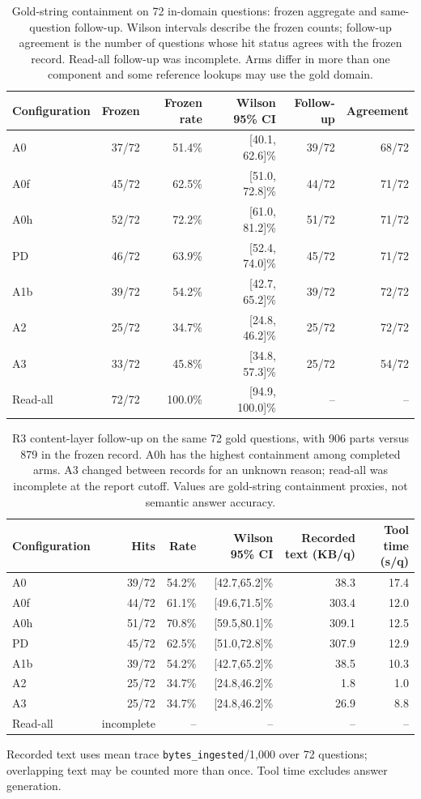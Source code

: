 \begin{table}[t]
\centering\small
\caption{Gold-string containment on 72 in-domain questions: frozen aggregate and same-question follow-up. Wilson intervals describe the frozen counts; follow-up agreement is the number of questions whose hit status agrees with the frozen record. Read-all follow-up was incomplete. Arms differ in more than one component and some reference lookups may use the gold domain.}
\label{tab:s-arm-data}
\begin{tabular}{lrrrrr}
\toprule
Configuration & Frozen & Frozen rate & Wilson 95\% CI & Follow-up & Agreement \\
\midrule
A0 & 37/72 & 51.4\% & [40.1, 62.6]\% & 39/72 & 68/72 \\
A0f & 45/72 & 62.5\% & [51.0, 72.8]\% & 44/72 & 71/72 \\
A0h & 52/72 & 72.2\% & [61.0, 81.2]\% & 51/72 & 71/72 \\
PD & 46/72 & 63.9\% & [52.4, 74.0]\% & 45/72 & 71/72 \\
A1b & 39/72 & 54.2\% & [42.7, 65.2]\% & 39/72 & 72/72 \\
A2 & 25/72 & 34.7\% & [24.8, 46.2]\% & 25/72 & 72/72 \\
A3 & 33/72 & 45.8\% & [34.8, 57.3]\% & 25/72 & 54/72 \\
Read-all & 72/72 & 100.0\% & [94.9, 100.0]\% & -- & -- \\
\bottomrule
\end{tabular}
\end{table}
\begin{table}[t]
\centering\small
\caption{R3 content-layer follow-up on the same 72 gold
questions, with 906 parts versus 879 in the frozen record. A0h has the highest containment among completed arms. A3 changed
between records for an unknown reason; read-all was incomplete at the report cutoff. Values are gold-string
containment proxies, not semantic answer accuracy.}
\label{tab:s-r3-content}
\begin{tabular}{lrrrrr}
\toprule
Configuration & Hits & Rate & Wilson 95\% CI & Recorded text (KB/q) & Tool time (s/q) \\
\midrule
A0 & 39/72 & 54.2\% & [42.7,65.2]\% & 38.3 & 17.4 \\
A0f & 44/72 & 61.1\% & [49.6,71.5]\% & 303.4 & 12.0 \\
A0h & 51/72 & 70.8\% & [59.5,80.1]\% & 309.1 & 12.5 \\
PD & 45/72 & 62.5\% & [51.0,72.8]\% & 307.9 & 12.9 \\
A1b & 39/72 & 54.2\% & [42.7,65.2]\% & 38.5 & 10.3 \\
A2 & 25/72 & 34.7\% & [24.8,46.2]\% & 1.8 & 1.0 \\
A3 & 25/72 & 34.7\% & [24.8,46.2]\% & 26.9 & 8.8 \\
Read-all & incomplete & -- & -- & -- & -- \\
\bottomrule
\end{tabular}
\par\vspace{5pt}
\parbox{0.97\textwidth}{\footnotesize Recorded text uses mean trace \texttt{bytes\_ingested}/1,000 over 72 questions; overlapping text may be counted more than once. Tool time excludes answer generation.}
\end{table}
